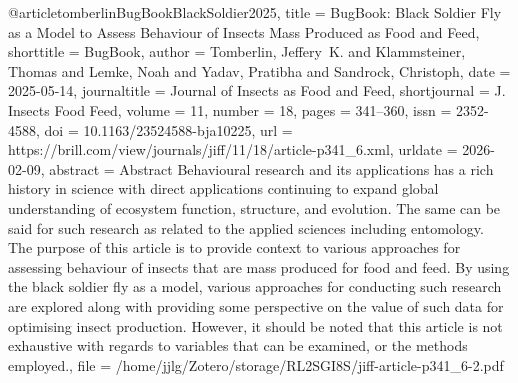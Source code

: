 {{{{@article{tomberlinBugBookBlackSoldier2025,
  title = {{{BugBook}}: {{Black}} Soldier Fly as a Model to Assess Behaviour of Insects Mass Produced as Food and Feed},
  shorttitle = {{{BugBook}}},
  author = {Tomberlin, Jeffery~K. and Klammsteiner, Thomas and Lemke, Noah and Yadav, Pratibha and Sandrock, Christoph},
  date = {2025-05-14},
  journaltitle = {Journal of Insects as Food and Feed},
  shortjournal = {J. Insects Food Feed},
  volume = {11},
  number = {18},
  pages = {341--360},
  issn = {2352-4588},
  doi = {10.1163/23524588-bja10225},
  url = {https://brill.com/view/journals/jiff/11/18/article-p341_6.xml},
  urldate = {2026-02-09},
  abstract = {Abstract             Behavioural research and its applications has a rich history in science with direct applications continuing to expand global understanding of ecosystem function, structure, and evolution. The same can be said for such research as related to the applied sciences including entomology. The purpose of this article is to provide context to various approaches for assessing behaviour of insects that are mass produced for food and feed. By using the black soldier fly as a model, various approaches for conducting such research are explored along with providing some perspective on the value of such data for optimising insect production. However, it should be noted that this article is not exhaustive with regards to variables that can be examined, or the methods employed.},
  file = {/home/jjlg/Zotero/storage/RL2SGI8S/jiff-article-p341_6-2.pdf}
}

}}}}
